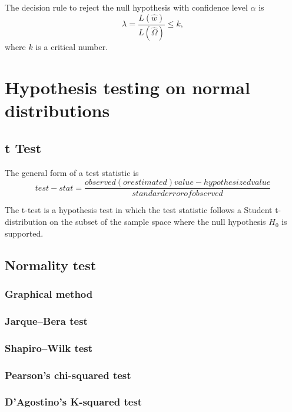 \begin{refsection}
\begin{definition}
The decision rule to reject the null hypothesis with confidence level $\alpha$ is 
$$\lambda  = \frac{L(\hat{w})}{L(\hat{\Omega})} \leq k,$$
where $k$ is a critical number. 
\end{definition}


\section{Hypothesis testing on normal distributions}
\subsection{t Test}
\begin{definition}
	The general form of a test statistic is
	$$test-stat = \frac{observed(or estimated) value - hypothesized value}{standard error of observed}$$
\end{definition}



\begin{definition}[t-Test]
	The t-test is a hypothesis test in which the test statistic follows a Student t-distribution on the subset of the sample space where the null hypothesis $H_0$ is supported.
\end{definition}


\subsection{Normality test}


\subsubsection{Graphical method}

\subsubsection{Jarque–Bera test}

\subsubsection{Shapiro–Wilk test}

\subsubsection{Pearson's chi-squared test}

\subsubsection{D'Agostino's K-squared test}


\end{refsection}
